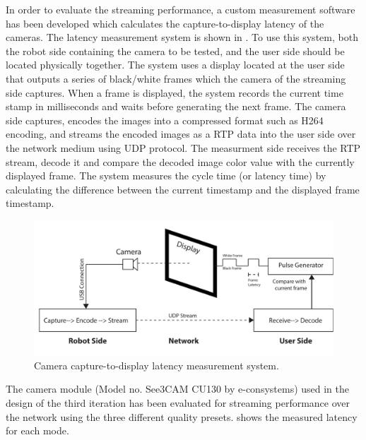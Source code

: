 In order to evaluate the streaming performance, a custom measurement software has been developed which calculates the capture-to-display latency of the cameras. The latency measurement system is shown in . To use this system, both the robot side containing the camera to be tested, and the user side should be located physically together. The system uses a display located at the user side that outputs a series of black/white frames which the camera of the streaming side captures. When a frame is displayed, the system records the current time stamp in milliseconds and waits before generating the next frame. The camera side captures, encodes the images into a compressed format such as H264 encoding, and streams the encoded images as a RTP data into the user side over the network medium using UDP protocol. The measurment side receives the RTP stream, decode it and compare the decoded image color value with the currently displayed frame. The system measures the cycle time (or latency time) by calculating the difference between the current timestamp and the displayed frame timestamp. 
 

\begin{figure}[htpb]
\centering
  \captionsetup{justification=centering}
\includegraphics[width=1\textwidth]{figures/system/LatencyMeasurment.pdf}
\caption{Camera capture-to-display latency measurement system.}
  \label{fig:system-txkit-latencymeasure}
\end{figure}

 
The camera module (Model no. See3CAM CU130 by e-consystems) used in the design of the third iteration has been evaluated for streaming performance over the network using the three different quality presets.  shows the measured latency for each mode. 


